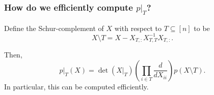 \documentclass{beamer}
\begin{document}
\begin{frame}
    \frametitle{How do we efficiently compute $p|_T$?}
    Define the Schur-complement of $X$ with respect to $T \subseteq [n]$ to be
    \[
        X \setminus T = X - X_{T,:} X_{T,T}^{-1} X_{T,:}.
    \]

    Then,
    \[
        p|_T(X) = \det(X|_T) (\prod_{i\in  T} \frac{d}{dX_{ii}}) p(X \setminus T).
    \]
    In particular, this can be computed efficiently.
\end{frame}
%
%
\end{document}
